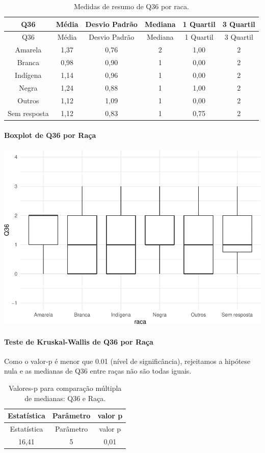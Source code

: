 \documentclass[]{article}
\let\oldparagraph\paragraph
\renewcommand{\paragraph}[1]{\oldparagraph{#1}\mbox{}}
\begin{document}
\begin{longtable}[]{@{}cccccc@{}}
\caption{\label{tab:unnamed-chunk-1345}Medidas de resumo de Q36 por raca.}\tabularnewline
\toprule
Q36 & Média & Desvio Padrão & Mediana & 1 Quartil & 3 Quartil\tabularnewline
\midrule
\endfirsthead
\toprule
Q36 & Média & Desvio Padrão & Mediana & 1 Quartil & 3 Quartil\tabularnewline
\midrule
\endhead
Amarela & 1,37 & 0,76 & 2 & 1,00 & 2\tabularnewline
Branca & 0,98 & 0,90 & 1 & 0,00 & 2\tabularnewline
Indígena & 1,14 & 0,96 & 1 & 0,00 & 2\tabularnewline
Negra & 1,24 & 0,88 & 1 & 1,00 & 2\tabularnewline
Outros & 1,12 & 1,09 & 1 & 0,00 & 2\tabularnewline
Sem resposta & 1,12 & 0,83 & 1 & 0,75 & 2\tabularnewline
\bottomrule
\end{longtable}

\hypertarget{boxplot-de-q36-por-rauxe7a}{%
\paragraph{Boxplot de Q36 por Raça}\label{boxplot-de-q36-por-rauxe7a}}

\begin{center}\includegraphics[width=0.75\linewidth]{relatorio_covid19_files/figure-latex/unnamed-chunk-1346-1} \end{center}

\hypertarget{teste-de-kruskal-wallis-de-q36-por-rauxe7a}{%
\paragraph{Teste de Kruskal-Wallis de Q36 por Raça}\label{teste-de-kruskal-wallis-de-q36-por-rauxe7a}}

Como o valor-p é menor que 0.01 (nível de significância), rejeitamos a hipótese nula e as medianas de Q36 entre raças não são todas iguais.

\begin{longtable}[]{@{}ccc@{}}
\caption{\label{tab:unnamed-chunk-1348}Valores-p para comparação múltipla de medianas: Q36 e Raça.}\tabularnewline
\toprule
Estatística & Parâmetro & valor p\tabularnewline
\midrule
\endfirsthead
\toprule
Estatística & Parâmetro & valor p\tabularnewline
\midrule
\endhead
16,41 & 5 & 0,01\tabularnewline
\bottomrule
\end{longtable}
\end{document}

